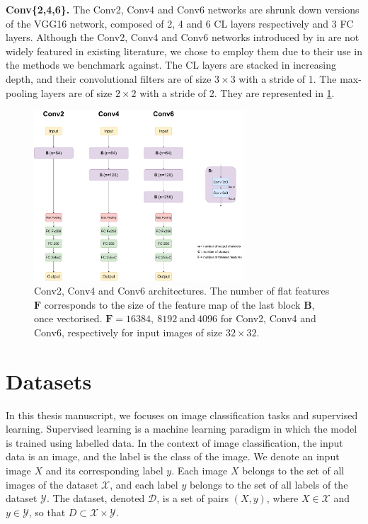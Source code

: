 \noindent \textbf{Conv\{2,4,6\}.} The Conv2, Conv4 and Conv6 networks are shrunk
down versions of the VGG16 network, composed of 2, 4 and 6 \ac{CL} layers
respectively and 3 \ac{FC} layers. Although the Conv2, Conv4 and Conv6 networks
introduced by \citeauthor{DBLP:conf/iclr/FrankleC19} in
\cite{DBLP:conf/iclr/FrankleC19} are not widely featured in existing literature,
we chose to employ them due to their use in the methods we benchmark against.
The \ac{CL} layers are stacked in increasing depth, and their
convolutional filters are of size $3\times 3$ with a stride of 1. The
max-pooling layers are of size $2\times 2$ with a stride of 2. They are
represented in \cref{fig:dlo:conv246}.\\

\begin{figure}[htbp]
  \centering
  \includegraphics[width=0.7\textwidth]{chapter_dlo/assets/conv246.pdf}
  \caption{Conv2, Conv4 and Conv6 architectures. The number of flat features
  $\mathbf{F}$ corresponds to the size of the feature map of the last block
  $\mathbf{B}$, once vectorised. $\mathbf{F}=16384, ~8192~ \text{and}~ 4096$ for Conv2, Conv4
  and Conv6, respectively for input images of size $32\times 32$.}
  \label{fig:dlo:conv246}
\end{figure}


\section{Datasets}\label{sec:dlo:datasets}

In this thesis manuscript, we focuses on image classification tasks and
supervised learning. Supervised learning is a machine learning paradigm in which
the model is trained using labelled data. In the context of image
classification, the input data is an image, and the label is the class of the
image. We denote an input image $X$ and its corresponding label $y$. Each image
$X$ belongs to the set of all images of the dataset $\mathcal{X}$, and each
label $y$ belongs to the set of all labels of the dataset $\mathcal{Y}$. The
dataset, denoted $\mathcal{D}$, is a set of pairs $(X, y)$, where $X \in
  \mathcal{X}$ and $y \in \mathcal{Y}$, so that $D \subset \mathcal{X} \times
  \mathcal{Y}$. \\

